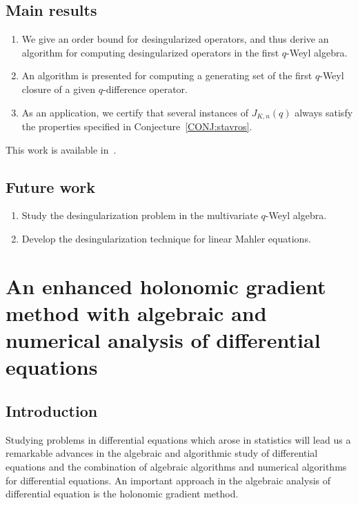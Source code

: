 \documentclass[10pt,a4paper]{article}
\begin{document}
\subsection{Main results}

\begin{enumerate}
 \item We give an order bound for desingularized operators, and thus derive
an algorithm for computing desingularized operators in the first $q$-Weyl
algebra.
 \item An algorithm is presented for computing a generating set
of the first $q$-Weyl closure of a given $q$-difference operator.
 \item As an application, we certify that several instances of $J_{K,n}(q)$ always 
 satisfy the properties specified in Conjecture~\ref{CONJ:stavros}.  
\end{enumerate}



This work is available in~\cite{KZ2018}.

\subsection{Future work}

\begin{enumerate}
 \item Study the desingularization problem in the multivariate $q$-Weyl algebra.
 \item Develop the desingularization technique for linear Mahler equations. 
\end{enumerate}

\section{An enhanced holonomic gradient method with algebraic and numerical analysis of differential equations} \label{SECT:HGM}

\subsection{Introduction}

Studying problems in differential equations which arose in statistics will lead us a remarkable advances in the algebraic and algorithmic study of differential equations and the combination of algebraic algorithms and numerical algorithms for differential equations. An important approach in the algebraic analysis of differential equation is the holonomic gradient method. 
\end{document}
